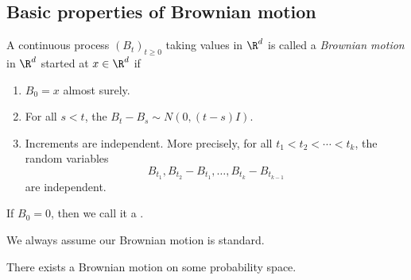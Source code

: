 \documentclass[a4paper]{article}
\begin{document}
\subsection{Basic properties of Brownian motion}
\begin{defi}
  A continuous process $(B_t)_{t \geq 0}$ taking values in $\R^d$ is called a \emph{Brownian motion} in $\R^d$ started at $x \in \R^d$ if
  \begin{enumerate}
    \item $B_0 = x$ almost surely.
    \item For all $s < t$, the  $B_t - B_s \sim N(0, (t - s) I)$.
    \item Increments are independent. More precisely, for all $t_1 < t_2 < \cdots < t_k$, the random variables
      \[
        B_{t_1}, B_{t_2} - B_{t_1}, \ldots, B_{t_k} - B_{t_{k - 1}}
      \]
      are independent.
  \end{enumerate}
  If $B_0 = 0$, then we call it a .
\end{defi}
We always assume our Brownian motion is standard.

\begin{thm}
  There exists a Brownian motion on some probability space.
\end{thm}
\end{document}
